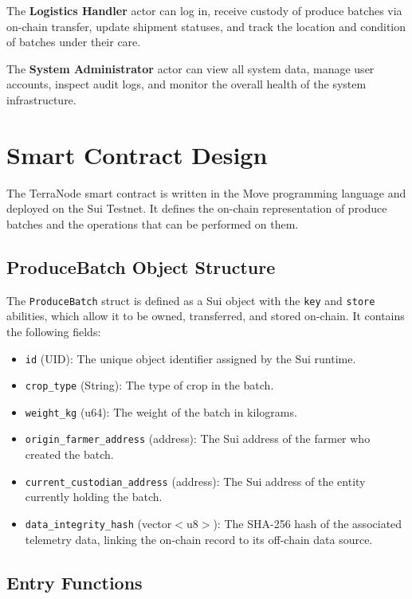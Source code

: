 The \textbf{Logistics Handler} actor can log in, receive custody of produce batches via on-chain transfer, update shipment statuses, and track the location and condition of batches under their care.

The \textbf{System Administrator} actor can view all system data, manage user accounts, inspect audit logs, and monitor the overall health of the system infrastructure.

\section{Smart Contract Design}

The TerraNode smart contract is written in the Move programming language and deployed on the Sui Testnet. It defines the on-chain representation of produce batches and the operations that can be performed on them.

\subsection{ProduceBatch Object Structure}

The \texttt{ProduceBatch} struct is defined as a Sui object with the \texttt{key} and \texttt{store} abilities, which allow it to be owned, transferred, and stored on-chain. It contains the following fields:

\begin{itemize}
    \item \texttt{id} (UID): The unique object identifier assigned by the Sui runtime.
    \item \texttt{crop\_type} (String): The type of crop in the batch.
    \item \texttt{weight\_kg} (u64): The weight of the batch in kilograms.
    \item \texttt{origin\_farmer\_address} (address): The Sui address of the farmer who created the batch.
    \item \texttt{current\_custodian\_address} (address): The Sui address of the entity currently holding the batch.
    \item \texttt{data\_integrity\_hash} (vector$<$u8$>$): The SHA-256 hash of the associated telemetry data, linking the on-chain record to its off-chain data source.
\end{itemize}

\subsection{Entry Functions}

